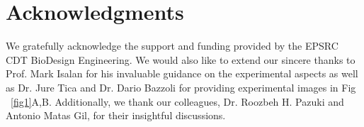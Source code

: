 \documentclass[10pt,letterpaper]{article}
\begin{document}
\section*{Acknowledgments}
We gratefully acknowledge the support and funding provided by the EPSRC CDT BioDesign Engineering. We would also like to extend our sincere thanks to Prof. Mark Isalan for his invaluable guidance on the experimental aspects as well as Dr. Jure Tica and Dr. Dario Bazzoli for providing experimental images in Fig ~\ref{fig1}A,B. Additionally, we thank our colleagues, Dr. Roozbeh H. Pazuki
 and Antonio Matas Gil, for their insightful discussions.


%
%


%
%
%



%
\end{document}
